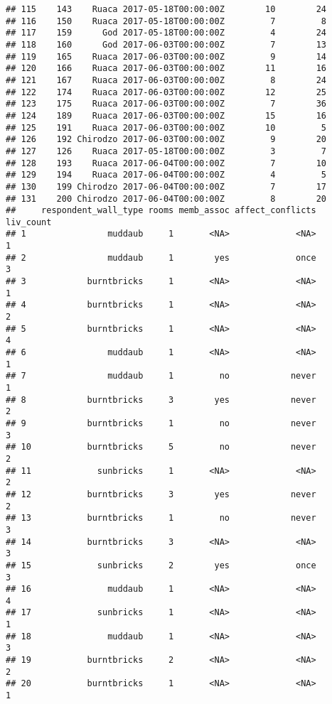 \documentclass[
]{article}
\begin{document}
\begin{verbatim}
## 115    143    Ruaca 2017-05-18T00:00:00Z        10        24
## 116    150    Ruaca 2017-05-18T00:00:00Z         7         8
## 117    159      God 2017-05-18T00:00:00Z         4        24
## 118    160      God 2017-06-03T00:00:00Z         7        13
## 119    165    Ruaca 2017-06-03T00:00:00Z         9        14
## 120    166    Ruaca 2017-06-03T00:00:00Z        11        16
## 121    167    Ruaca 2017-06-03T00:00:00Z         8        24
## 122    174    Ruaca 2017-06-03T00:00:00Z        12        25
## 123    175    Ruaca 2017-06-03T00:00:00Z         7        36
## 124    189    Ruaca 2017-06-03T00:00:00Z        15        16
## 125    191    Ruaca 2017-06-03T00:00:00Z        10         5
## 126    192 Chirodzo 2017-06-03T00:00:00Z         9        20
## 127    126    Ruaca 2017-05-18T00:00:00Z         3         7
## 128    193    Ruaca 2017-06-04T00:00:00Z         7        10
## 129    194    Ruaca 2017-06-04T00:00:00Z         4         5
## 130    199 Chirodzo 2017-06-04T00:00:00Z         7        17
## 131    200 Chirodzo 2017-06-04T00:00:00Z         8        20
##     respondent_wall_type rooms memb_assoc affect_conflicts liv_count
## 1                muddaub     1       <NA>             <NA>         1
## 2                muddaub     1        yes             once         3
## 3            burntbricks     1       <NA>             <NA>         1
## 4            burntbricks     1       <NA>             <NA>         2
## 5            burntbricks     1       <NA>             <NA>         4
## 6                muddaub     1       <NA>             <NA>         1
## 7                muddaub     1         no            never         1
## 8            burntbricks     3        yes            never         2
## 9            burntbricks     1         no            never         3
## 10           burntbricks     5         no            never         2
## 11             sunbricks     1       <NA>             <NA>         2
## 12           burntbricks     3        yes            never         2
## 13           burntbricks     1         no            never         3
## 14           burntbricks     3       <NA>             <NA>         3
## 15             sunbricks     2        yes             once         3
## 16               muddaub     1       <NA>             <NA>         4
## 17             sunbricks     1       <NA>             <NA>         1
## 18               muddaub     1       <NA>             <NA>         3
## 19           burntbricks     2       <NA>             <NA>         2
## 20           burntbricks     1       <NA>             <NA>         1

\end{verbatim}
\end{document}
